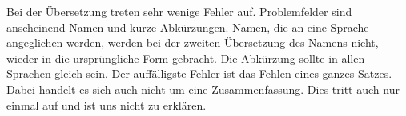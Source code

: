 Bei der Übersetzung treten sehr wenige Fehler auf. Problemfelder sind anscheinend Namen und kurze Abkürzungen. Namen, die an eine Sprache angeglichen werden, werden bei der zweiten Übersetzung des Namens nicht, wieder in die ursprüngliche Form gebracht. Die Abkürzung sollte in allen Sprachen gleich sein. Der auffälligste Fehler ist das Fehlen eines ganzes Satzes. Dabei handelt es sich auch nicht um eine Zusammenfassung. Dies tritt auch nur einmal auf und ist uns nicht zu erklären.